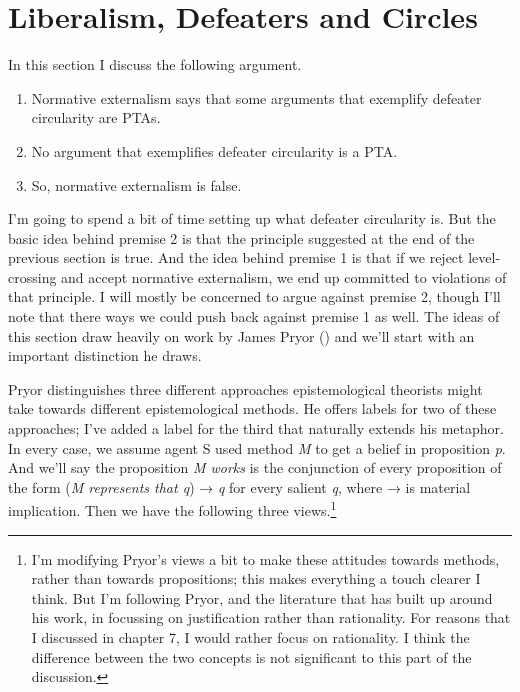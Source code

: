 \documentclass[
  10pt,
  letterpaper,
  twoside]{scrbook}
\providecommand{\tightlist}{%
  \setlength{\itemsep}{0pt}\setlength{\parskip}{0pt}}\usepackage{longtable,booktabs,array}
\begin{document}
\section{Liberalism, Defeaters and
Circles}\label{liberalismdefeatersandcircles}

In this section I discuss the following argument.

\begin{enumerate}
\def\labelenumi{\arabic{enumi}.}
\tightlist
\item
  Normative externalism says that some arguments that exemplify defeater
  circularity are PTAs.
\item
  No argument that exemplifies defeater circularity is a PTA.
\item
  So, normative externalism is false.
\end{enumerate}

I'm going to spend a bit of time setting up what defeater circularity
is. But the basic idea behind premise 2 is that the principle suggested
at the end of the previous section is true. And the idea behind premise
1 is that if we reject level-crossing and accept normative externalism,
we end up committed to violations of that principle. I will mostly be
concerned to argue against premise 2, though I'll note that there ways
we could push back against premise 1 as well. The ideas of this section
draw heavily on work by James Pryor () and
we'll start with an important distinction he draws.

Pryor distinguishes three different approaches epistemological theorists
might take towards different epistemological methods. He offers labels
for two of these approaches; I've added a label for the third that
naturally extends his metaphor. In every case, we assume agent S used
method \emph{M} to get a belief in proposition \emph{p}. And we'll say
the proposition \emph{M works} is the conjunction of every proposition
of the form (\emph{M represents that q}) → \emph{q} for every salient
\emph{q}, where → is material implication. Then we have the following
three views.\footnote{I'm modifying Pryor's views a bit to make these
  attitudes towards methods, rather than towards propositions; this
  makes everything a touch clearer I think. But I'm following Pryor, and
  the literature that has built up around his work, in focussing on
  justification rather than rationality. For reasons that I discussed in
  chapter 7, I would rather focus on rationality. I think the difference
  between the two concepts is not significant to this part of the
  discussion.}
\end{document}
